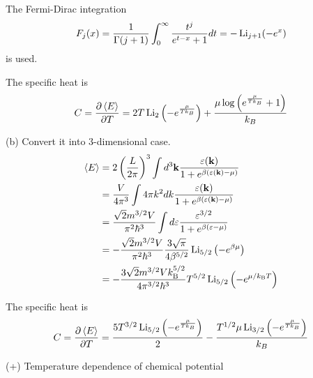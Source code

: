 \documentclass[a4paper,11pt]{article}
\begin{document}
The Fermi-Dirac integration
\begin{equation}
    F_j(x)=\frac{1}{\Gamma(j+1)}\int_0^\infty\frac{t^j}{e^{t-x} + 1}dt = -\operatorname{Li}_{j+1}(-e^x)
\end{equation}
is used.

The specific heat is
\begin{equation}
    C=\frac{\partial\braket{E}}{\partial T} = 2 T \operatorname{Li}_{2}\left(- e^{\frac{\mu}{T k_{B}}}\right) + \frac{\mu \log{\left(e^{\frac{\mu}{T k_{B}}} + 1 \right)}}{k_{B}}
\end{equation}

(b)
Convert it into 3-dimensional case.
\begin{align}
    \braket{E}
    &=2\left(\frac{L}{2\pi}\right)^3\int d^3\mathbf k \frac{\varepsilon(\mathbf k)}{1 + e^{\beta(\varepsilon(\mathbf k) - \mu)}} \\
    &=\frac{V}{4\pi^3}\int 4\pi k^2 d k \frac{\varepsilon(\mathbf k)}{1 + e^{\beta(\varepsilon(\mathbf k) - \mu)}} \\
    &= \frac{\sqrt{2}m^{3/2}V}{\pi^2\hbar^3}\int d\varepsilon \frac{\varepsilon^{3/2}}{1 + e^{\beta(\varepsilon - \mu)}} \\
    &= -\frac{\sqrt{2}m^{3/2}V}{\pi^2\hbar^3}\frac{3\sqrt{\pi}}{4\beta^{5/2}}\operatorname{Li}_{5/2}\left(-e^{\beta\mu}\right)\\
    &= -\frac{3\sqrt{2}m^{3/2}Vk_{\mathrm{B}}^{5/2}}{4\pi^{3/2}\hbar^3}T^{5/2}\operatorname{Li}_{5/2}\left(-e^{\mu/k_{\mathrm{B}} T}\right)
\end{align}

The specific heat is
\begin{equation}
    C=\frac{\partial\braket{E}}{\partial T} = \frac{5 T^{3/2} \operatorname{Li}_{5/2}\left(- e^{\frac{\mu}{T k_{B}}}\right)}{2} - \frac{T^{1/2} \mu \operatorname{Li}_{3/2}\left(- e^{\frac{\mu}{T k_{B}}}\right)}{k_{B}}
\end{equation}

(+) Temperature dependence of chemical potential
\end{document}
